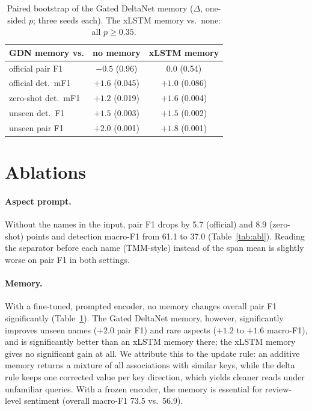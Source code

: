 \documentclass[11pt]{article}
\begin{document}
\begin{table}[t]
\centering\footnotesize
\setlength{\tabcolsep}{3pt}
\begin{tabular}{lcc}
\toprule
GDN memory vs. & no memory & xLSTM memory \\
\midrule
official pair F1 & $-0.5$ (0.96) & $0.0$ (0.54) \\
official det.\ mF1 & $+1.6$ (0.045) & $+1.0$ (0.086) \\
zero-shot det.\ mF1 & $+1.2$ (0.019) & $+1.6$ (0.004) \\
unseen det.\ F1 & $+1.5$ (0.003) & $+1.5$ (0.002) \\
unseen pair F1 & $+2.0$ (0.001) & $+1.8$ (0.001) \\
\bottomrule
\end{tabular}
\caption{Paired bootstrap of the Gated DeltaNet memory ($\Delta$, one-sided $p$; three seeds each).
The xLSTM memory vs.\ none: all $p\geq0.35$.}
\label{tab:mem}
\end{table}

\section{Ablations}
\paragraph{Aspect prompt.} Without the names in the input, pair F1 drops by 5.7 (official) and 8.9
(zero-shot) points and detection macro-F1 from 61.1 to 37.0 (Table~\ref{tab:abl}). Reading the separator
before each name (TMM-style) instead of the span mean is slightly worse on pair F1 in both settings.

\paragraph{Memory.} With a fine-tuned, prompted encoder, no memory changes overall pair F1
significantly (Table~\ref{tab:mem}). The Gated DeltaNet memory, however, significantly improves unseen
names ($+2.0$ pair F1) and rare aspects ($+1.2$ to $+1.6$ macro-F1), and is significantly better than an
xLSTM memory there; the xLSTM memory gives no significant gain at all. We attribute this to the update
rule: an additive memory returns a mixture of all associations with similar keys, while the delta rule
keeps one corrected value per key direction, which yields cleaner reads under unfamiliar queries. With
a frozen encoder, the memory is essential for review-level sentiment (overall macro-F1 73.5 vs.\ 56.9).
\end{document}
